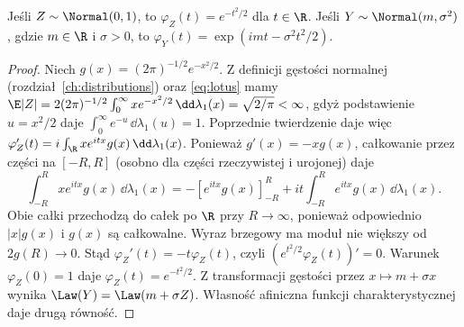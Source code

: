 \begin{lemat}
Jeśli $Z\sim\Normal(0,1)$, to
$\varphi_Z(t)=e^{-t^2/2}$ dla $t\in\R$.
Jeśli $Y\sim\Normal(m,\sigma^2)$, gdzie $m\in\R$ i
$\sigma>0$, to
$\varphi_Y(t)=\exp(imt-\sigma^2t^2/2)$.
\end{lemat}
\begin{proof}
Niech $g(x)=(2\pi)^{-1/2}e^{-x^2/2}$.
Z definicji gęstości normalnej (rozdział~\ref{ch:distributions})
oraz \eqref{eq:lotus} mamy
$\E|Z|=2(2\pi)^{-1/2}\int_0^\infty xe^{-x^2/2}\,\dd\lambda_1(x)
=\sqrt{2/\pi}<\infty$, gdyż podstawienie $u=x^2/2$
daje $\int_0^\infty e^{-u}\,\dd\lambda_1(u)=1$.
Poprzednie twierdzenie daje więc
$\varphi_Z'(t)=i\int_\R xe^{itx}g(x)\,\dd\lambda_1(x)$.
Ponieważ $g'(x)=-xg(x)$, całkowanie przez części na
$[-R,R]$ (osobno dla części rzeczywistej i urojonej) daje
\[
\int_{-R}^R xe^{itx}g(x)\,\dd\lambda_1(x)
=-[e^{itx}g(x)]_{-R}^R+
it\int_{-R}^R e^{itx}g(x)\,\dd\lambda_1(x).
\]
Obie całki przechodzą do całek po $\R$ przy $R\to\infty$,
ponieważ odpowiednio $|x|g(x)$ i $g(x)$ są całkowalne.
Wyraz brzegowy ma moduł nie większy od $2g(R)\to0$.
Stąd $\varphi_Z'(t)=-t\varphi_Z(t)$, czyli
$(e^{t^2/2}\varphi_Z(t))'=0$.
Warunek $\varphi_Z(0)=1$ daje $\varphi_Z(t)=e^{-t^2/2}$.
Z transformacji gęstości przez $x\mapsto m+\sigma x$
wynika $\Law(Y)=\Law(m+\sigma Z)$.
Własność afiniczna funkcji charakterystycznej daje drugą równość.
\end{proof}

